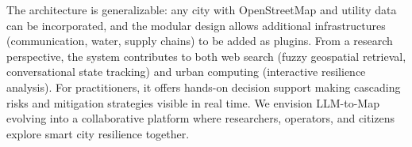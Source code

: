 \documentclass[sigconf,review,nonacm]{acmart}
\begin{document}
The architecture is generalizable: any city with OpenStreetMap and utility data can be incorporated, and the modular design allows additional infrastructures (communication, water, supply chains) to be added as plugins. From a research perspective, the system contributes to both web search (fuzzy geospatial retrieval, conversational state tracking) and urban computing (interactive resilience analysis). For practitioners, it offers hands-on decision support making cascading risks and mitigation strategies visible in real time. We envision LLM-to-Map evolving into a collaborative platform where researchers, operators, and citizens explore smart city resilience together.



\end{document}
